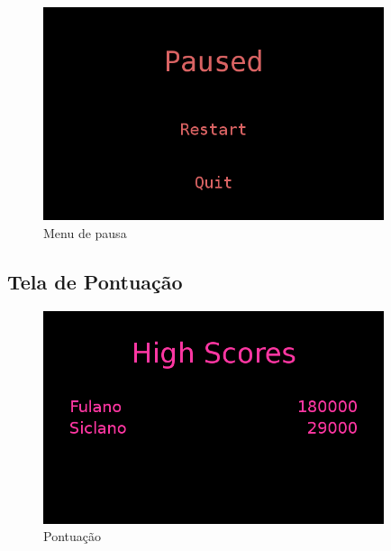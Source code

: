 \documentclass[12pt]{article}
\begin{document}
\begin{figure}[H]
\centering
\includegraphics[width=100mm]{pauseMenu.png}
\caption{Menu de pausa}
\label{pm}
\end{figure}

\subsection{Tela de Pontuação}

\begin{figure}[H]
\centering
\includegraphics[width=100mm]{highScores.png}
\caption{Pontuação}
\label{hs}
\end{figure}


\end{document}
